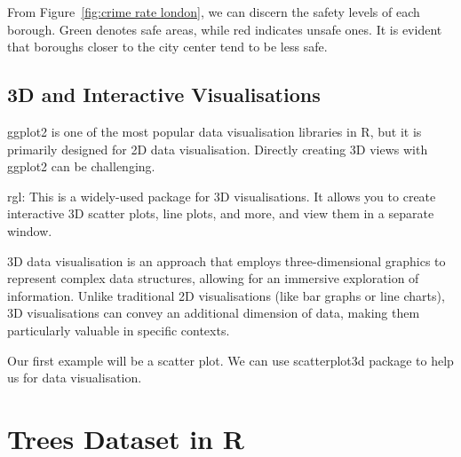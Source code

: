 \documentclass{article}\usepackage[]{graphicx}\usepackage[]{xcolor}
\begin{document}
From Figure~\ref{fig:crime rate london}, we can discern the safety levels of each borough. Green denotes safe areas, while red indicates unsafe ones. It is evident that boroughs closer to the city center tend to be less safe.

\subsection{3D and Interactive Visualisations}
ggplot2 is one of the most popular data visualisation libraries in R, but it is primarily designed for 2D data visualisation. Directly creating 3D views with ggplot2 can be challenging.

rgl: This is a widely-used package for 3D visualisations. It allows you to create interactive 3D scatter plots, line plots, and more, and view them in a separate window.

3D data visualisation is an approach that employs three-dimensional graphics to represent complex data structures, allowing for an immersive exploration of information. Unlike traditional 2D visualisations (like bar graphs or line charts), 3D visualisations can convey an additional dimension of data, making them particularly valuable in specific contexts.

Our first example will be  a scatter plot. We can use scatterplot3d package to help us for data visualisation.
\section{Trees Dataset in R}
\end{document}
